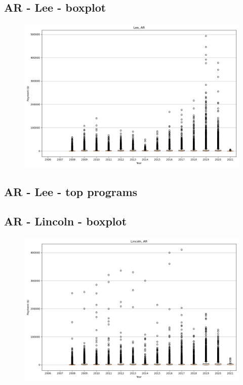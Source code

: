 \subsection*{AR - Lee - boxplot}
\begin{figure}[h]
\centering
\includegraphics[width=7in]{../output/boxplots/counties/Lee-AR_boxplot.png}
\end{figure}


\subsection*{AR - Lee - top programs}

\newpage
\subsection*{AR - Lincoln - boxplot}
\begin{figure}[h]
\centering
\includegraphics[width=7in]{../output/boxplots/counties/Lincoln-AR_boxplot.png}
\end{figure}


